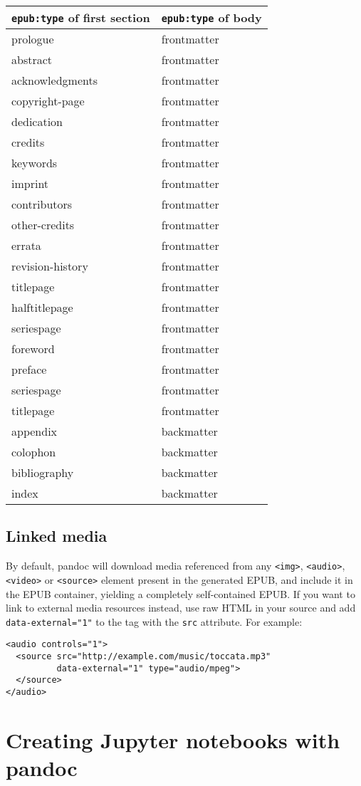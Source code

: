 \begin{longtable}[]{@{}ll@{}}
\toprule
\texttt{epub:type} of first section & \texttt{epub:type} of
body\tabularnewline
\midrule
\endhead
prologue & frontmatter\tabularnewline
abstract & frontmatter\tabularnewline
acknowledgments & frontmatter\tabularnewline
copyright-page & frontmatter\tabularnewline
dedication & frontmatter\tabularnewline
credits & frontmatter\tabularnewline
keywords & frontmatter\tabularnewline
imprint & frontmatter\tabularnewline
contributors & frontmatter\tabularnewline
other-credits & frontmatter\tabularnewline
errata & frontmatter\tabularnewline
revision-history & frontmatter\tabularnewline
titlepage & frontmatter\tabularnewline
halftitlepage & frontmatter\tabularnewline
seriespage & frontmatter\tabularnewline
foreword & frontmatter\tabularnewline
preface & frontmatter\tabularnewline
seriespage & frontmatter\tabularnewline
titlepage & frontmatter\tabularnewline
appendix & backmatter\tabularnewline
colophon & backmatter\tabularnewline
bibliography & backmatter\tabularnewline
index & backmatter\tabularnewline
\bottomrule
\end{longtable}

\hypertarget{linked-media}{%
\subsection{Linked media}\label{linked-media}}

By default, pandoc will download media referenced from any
\texttt{\textless{}img\textgreater{}},
\texttt{\textless{}audio\textgreater{}},
\texttt{\textless{}video\textgreater{}} or
\texttt{\textless{}source\textgreater{}} element present in the
generated EPUB, and include it in the EPUB container, yielding a
completely self-contained EPUB. If you want to link to external media
resources instead, use raw HTML in your source and add
\texttt{data-external="1"} to the tag with the \texttt{src} attribute.
For example:

\begin{verbatim}
<audio controls="1">
  <source src="http://example.com/music/toccata.mp3"
          data-external="1" type="audio/mpeg">
  </source>
</audio>
\end{verbatim}

\hypertarget{creating-jupyter-notebooks-with-pandoc}{%
\section{Creating Jupyter notebooks with
pandoc}\label{creating-jupyter-notebooks-with-pandoc}}

